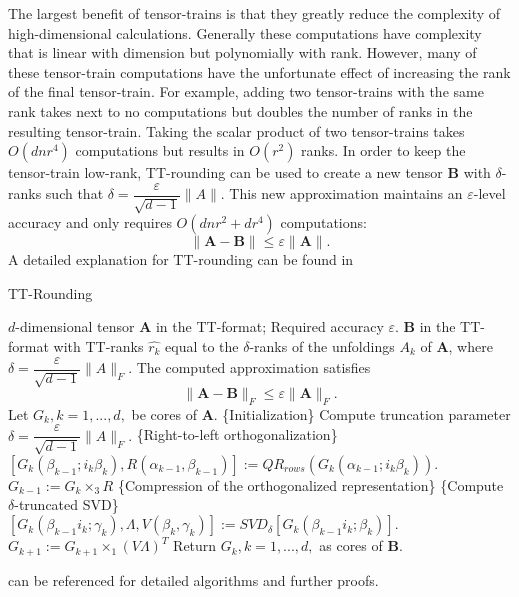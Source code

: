 The largest benefit of tensor-trains is that they greatly reduce the complexity of high-dimensional calculations. Generally these computations have complexity that is linear with dimension but polynomially with rank. However, many of these tensor-train computations have the unfortunate effect of increasing the rank of the final tensor-train. For example, adding two tensor-trains with the same rank takes next to no computations but doubles the number of ranks in the resulting tensor-train. Taking the scalar product of two tensor-trains takes $O(dnr^4)$ computations but results in $O(r^2)$ ranks. In order to keep the tensor-train low-rank, TT-rounding can be used to create a new tensor $\textbf{B}$ with $\delta$-ranks such that $\delta = \dfrac{\varepsilon}{\sqrt{d-1}}\| A\|$. This new approximation maintains an $\varepsilon$-level accuracy and only requires $O(dnr^2+dr^4)$ computations:
\begin{equation*}
\| \textbf{A}-\textbf{B}\| \leq \varepsilon \| \textbf{A} \|.
\end{equation*}
A detailed explanation for TT-rounding can be found in 
\begin{algorithm}
\caption{TT-Rounding \cite{Osel1}}\label{ttround}
\begin{algorithmic}[1]
	\Require $d$-dimensional tensor \textbf{A} in the TT-format; Required accuracy $\varepsilon$.
	\Ensure \textbf{B} in the TT-format with TT-ranks $\hat{r_k}$ equal to the $\delta$-ranks of the unfoldings $A_k$ of \textbf{A}, where $\delta = \dfrac{\varepsilon}{\sqrt{d-1}}\|A\|_F.$ The computed approximation satisfies
	\begin{equation*}
	\| \textbf{A}-\textbf{B}\|_F \leq \varepsilon\|\textbf{A}\|_F.
	\end{equation*}
	\State Let $G_k, k = 1,...,d,$ be cores of \textbf{A}. 
	\State \{Initialization\}
	\Statex	Compute truncation parameter $\delta = \dfrac{\varepsilon}{\sqrt{d-1}}\|A\|_F.$
	\State \{Right-to-left orthogonalization\} 
	 \do{}
		\State $[G_k(\beta_{k-1};i_k\beta_k),R(\alpha_{k-1},\beta_{k-1})] := QR_{rows}(G_k(\alpha_{k-1};i_k\beta_k)).$
		\State $G_{k-1} := G_k \times_3 R$
	\EndFor
	\State \{Compression of the orthogonalized representation\}
	 \do{}
		\State \{Compute $\delta$-truncated SVD\}
		\Statex $[G_k(\beta_{k-1}i_k;\gamma_k),\Lambda,V(\beta_k,\gamma_k)] := SVD_\delta[G_k(\beta_{k-1}i_k;\beta_k)].$
		\State $G_{k+1} := G_{k+1} \times_1 (V\Lambda)^T$
	\EndFor
	\State Return $G_k, k = 1,...,d,$ as cores of \textbf{B}.
\end{algorithmic}
\end{algorithm}

\cite{Osel1,Osel2} can be referenced for detailed algorithms and further proofs.